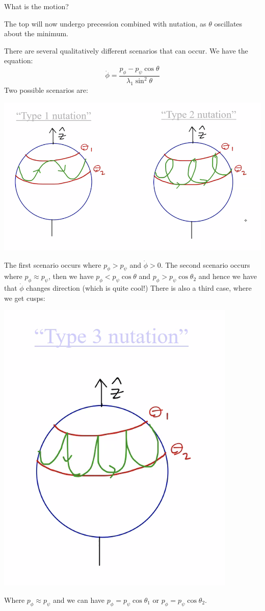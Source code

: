 What is the motion?
\begin{s}
The top will now undergo precession combined with nutation, as $\theta$ oscillates about the minimum. 
\end{s}
There are several qualitatively different scenarios that can occur. We have the equation:
\[\dot{\phi} = \frac{p_\phi - p_\psi\cos\theta}{\lambda_1\sin^2\theta}\]
Two possible scenarios are:
\begin{center}
    \includegraphics[scale=1]{Lecture-22/l22-img4.png}
\end{center}
The first scenario occurs where $p_\phi > p_\psi$ and $\dot{\phi} > 0$. The second scenario occurs where $p_\phi \approx p_\psi$, then we have $p_\phi < p_\psi\cos\theta$ and $p_\phi > p_\psi\cos\theta_2$ and hence we have that $\dot{\phi}$ changes direction (which is quite cool!) There is also a third case, where we get cusps:
\begin{center}
    \includegraphics[scale=0.8]{Lecture-22/l22-img5.png}
\end{center}
Where $p_\phi \approx p_\psi$ and we can have $p_\phi = p_\psi\cos\theta_1$ or $p_\phi = p_\psi\cos\theta_2$.

